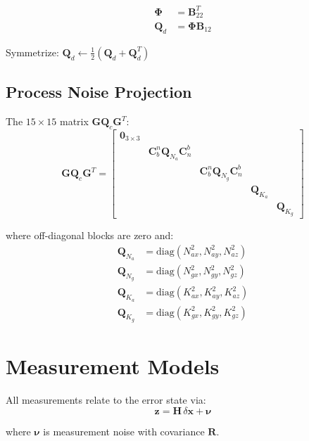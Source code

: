 \documentclass[11pt,a4paper]{article}
\newcommand{\mat}[1]{\mathbf{#1}}
\newcommand{\vect}[1]{\boldsymbol{#1}}
\begin{document}
\begin{align}
    \vect{\Phi} &= \mat{B}_{22}^T \label{eq:Phi_extract} \\
    \mat{Q}_d &= \vect{\Phi} \mat{B}_{12} \label{eq:Qd_extract}
\end{align}

Symmetrize: $\mat{Q}_d \leftarrow \frac{1}{2}(\mat{Q}_d + \mat{Q}_d^T)$

\subsection{Process Noise Projection}

The $15 \times 15$ matrix $\mat{G}\mat{Q}_c\mat{G}^T$:
\begin{equation}
    \mat{G}\mat{Q}_c\mat{G}^T = \begin{bmatrix}
        \mat{0}_{3\times3} & & & & \\
        & \mat{C}_b^n\mat{Q}_{N_a}\mat{C}_n^b & & & \\
        & & \mat{C}_b^n\mat{Q}_{N_g}\mat{C}_n^b & & \\
        & & & \mat{Q}_{K_a} & \\
        & & & & \mat{Q}_{K_g}
    \end{bmatrix}
\end{equation}

where off-diagonal blocks are zero and:
\begin{align}
    \mat{Q}_{N_a} &= \text{diag}(N_{ax}^2, N_{ay}^2, N_{az}^2) \\
    \mat{Q}_{N_g} &= \text{diag}(N_{gx}^2, N_{gy}^2, N_{gz}^2) \\
    \mat{Q}_{K_a} &= \text{diag}(K_{ax}^2, K_{ay}^2, K_{az}^2) \\
    \mat{Q}_{K_g} &= \text{diag}(K_{gx}^2, K_{gy}^2, K_{gz}^2)
\end{align}

\section{Measurement Models}

All measurements relate to the error state via:
\begin{equation}
    \mat{z} = \mat{H}\,\delta\mat{x} + \vect{\nu}
\end{equation}

where $\vect{\nu}$ is measurement noise with covariance $\mat{R}$.
\end{document}
